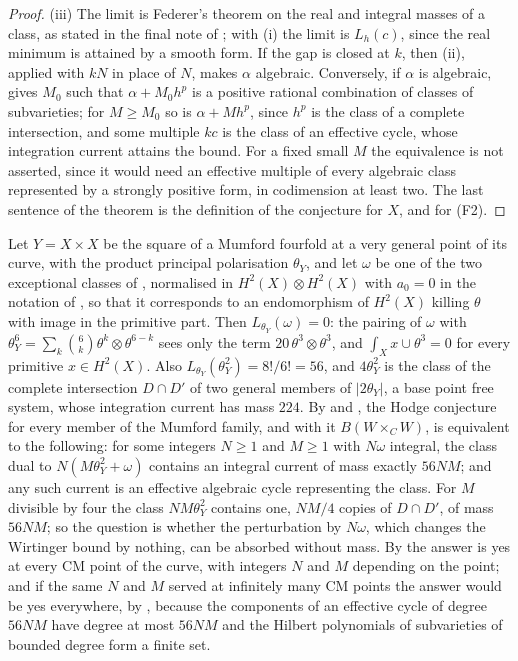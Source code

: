 \begin{proof}
(iii) The limit is Federer's theorem on the real and integral masses of a
class, as stated in the final note of \cite[Section~6]{HL09}; with (i) the
limit is $L_{h}(c)$, since the real minimum is attained by a smooth form. If
the gap is closed at $k$, then (ii), applied with $kN$ in place of $N$, makes
$\alpha$ algebraic. Conversely, if $\alpha$ is algebraic, 
gives $M_{0}$ such that $\alpha+M_{0}h^{p}$ is a positive rational
combination of classes of subvarieties; for $M\ge M_{0}$ so is
$\alpha+Mh^{p}$, since $h^{p}$ is the class of a complete intersection, and
some multiple $kc$ is the class of an effective cycle, whose integration
current attains the bound. For a fixed small $M$ the equivalence is not asserted, since it would
need an effective multiple of every algebraic class represented by a
strongly positive form, in codimension at least two. The last sentence of the
theorem is the definition of the conjecture for $X$, and 
for \textup{(F2)}.
\end{proof}

\begin{example}\label{ex:mumfordmass}
Let $Y=X\times X$ be the square of a Mumford fourfold at a very general point
of its curve, with the product principal polarisation $\theta_{Y}$, and let
$\omega$ be one of the two exceptional classes of ,
normalised in $H^{2}(X)\otimes H^{2}(X)$ with $a_{0}=0$ in the notation of
, so that it corresponds to an endomorphism of $H^{2}(X)$
killing $\theta$ with image in the primitive part. Then
$L_{\theta_{Y}}(\omega)=0$: the pairing of $\omega$ with
$\theta_{Y}^{6}=\sum_{k}\binom6k\theta^{k}\otimes\theta^{6-k}$ sees only the
term $20\,\theta^{3}\otimes\theta^{3}$, and $\int_{X}x\cup\theta^{3}=0$ for
every primitive $x\in H^{2}(X)$. Also $L_{\theta_{Y}}(\theta_{Y}^{2})=8!/6!=56$,
and $4\theta_{Y}^{2}$ is the class of the complete intersection $D\cap D'$ of two
general members of $|2\theta_{Y}|$, a base point free system, whose integration
current has mass $224$. By  and , the
Hodge conjecture for every member of the Mumford family, and with it
$B(W\times_{C}W)$, is equivalent to the following: for some integers
$N\ge1$ and $M\ge1$ with $N\omega$ integral, the class dual to
$N(M\theta_{Y}^{2}+\omega)$ contains an integral current of mass exactly
$56NM$; and any such current is an effective algebraic cycle representing the
class. For $M$ divisible by four the class $NM\theta_{Y}^{2}$ contains one,
$NM/4$ copies of $D\cap D'$, of mass $56NM$; so the question is whether the
perturbation by $N\omega$, which changes the Wirtinger bound by nothing, can
be absorbed without mass. By  the answer is yes at
every CM point of the curve, with integers $N$ and $M$ depending on the
point; and if the same $N$ and $M$ served at infinitely many CM points the
answer would be yes everywhere, by , because the
components of an effective cycle of degree $56NM$ have degree at most $56NM$
and the Hilbert polynomials of subvarieties of bounded degree form a finite
set.
\end{example}

